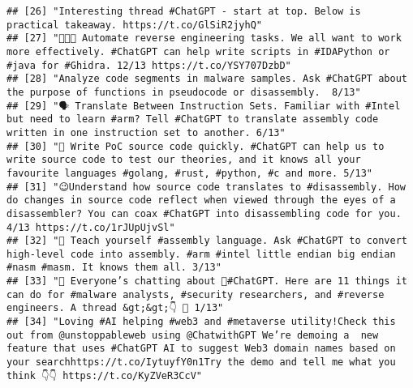 \documentclass[
]{article}
\begin{document}
\begin{verbatim}
## [26] "Interesting thread #ChatGPT - start at top. Below is practical takeaway. https://t.co/GlSiR2jyhQ"                                                                                                                                                                                                              
## [27] "👩🏿‍💻 Automate reverse engineering tasks. We all want to work more effectively. #ChatGPT can help write scripts in #IDAPython or #java for #Ghidra. 12/13 https://t.co/YSY707DzbD"                                                                                                                            
## [28] "Analyze code segments in malware samples. Ask #ChatGPT about the purpose of functions in pseudocode or disassembly.  8/13"                                                                                                                                                                                     
## [29] "🗣️ Translate Between Instruction Sets. Familiar with #Intel but need to learn #arm? Tell #ChatGPT to translate assembly code written in one instruction set to another. 6/13"                                                                                                                                   
## [30] "🧪 Write PoC source code quickly. #ChatGPT can help us to write source code to test our theories, and it knows all your favourite languages #golang, #rust, #python, #c and more. 5/13"                                                                                                                        
## [31] "😉Understand how source code translates to #disassembly. How do changes in source code reflect when viewed through the eyes of a disassembler? You can coax #ChatGPT into disassembling code for you.  4/13 https://t.co/1rJUpUjvSl"                                                                           
## [32] "👾 Teach yourself #assembly language. Ask #ChatGPT to convert high-level code into assembly. #arm #intel little endian big endian #nasm #masm. It knows them all. 3/13"                                                                                                                                        
## [33] "🧵 Everyone’s chatting about 🤖#ChatGPT. Here are 11 things it can do for #malware analysts, #security researchers, and #reverse engineers. A thread &gt;&gt;👇 🧵 1/13"                                                                                                                                       
## [34] "Loving #AI helping #web3 and #metaverse utility!Check this out from @unstoppableweb using @ChatwithGPT We’re demoing a  new feature that uses #ChatGPT AI to suggest Web3 domain names based on your searchhttps://t.co/IytuyfY0n1Try the demo and tell me what you think 👇👇 https://t.co/KyZVeR3CcV"        

\end{verbatim}
\end{document}
